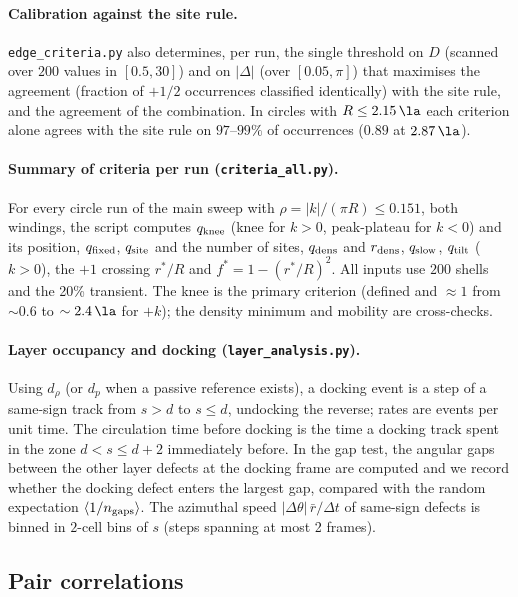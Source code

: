 \paragraph{Calibration against the site rule.}
\texttt{edge\_criteria.py} also determines, per run, the single threshold on $D$ (scanned over $200$ values
in $[0.5,30]$) and on $|\Delta|$ (over $[0.05,\pi]$) that maximises the agreement (fraction of $+1/2$
occurrences classified identically) with the site rule, and the agreement of the combination. In circles
with $R\le2.15\,\la$ each criterion alone agrees with the site rule on $97$--$99\%$ of occurrences
($0.89$ at $2.87\,\la$).

\paragraph{Summary of criteria per run (\texttt{criteria\_all.py}).}
For every circle run of the main sweep with $\rho=|k|/(\pi R)\le0.151$, both windings, the script computes
$q_{\rm knee}$ (knee for $k>0$, peak-plateau for $k<0$) and its position, $q_{\rm fixed}$, $q_{\rm site}$
and the number of sites, $q_{\rm dens}$ and $r_{\rm dens}$, $q_{\rm slow}$, $q_{\rm tilt}$ ($k>0$), the
$+1$ crossing $r^*/R$ and $f^*=1-(r^*/R)^2$. All inputs use $200$ shells and the 20\% transient.
The knee is the primary criterion (defined and $\approx1$ from $\sim0.6$ to $\sim2.4\,\la$ for $+k$); the
density minimum and mobility are cross-checks.

\paragraph{Layer occupancy and docking (\texttt{layer\_analysis.py}).}
Using $d_\rho$ (or $d_p$ when a passive reference exists), a docking event is a step of a same-sign track
from $s>d$ to $s\le d$, undocking the reverse; rates are events per unit time. The circulation time before
docking is the time a docking track spent in the zone $d<s\le d+2$ immediately before. In the gap test, the
angular gaps between the other layer defects at the docking frame are computed and we record whether the
docking defect enters the largest gap, compared with the random expectation $\langle 1/n_{\rm gaps}\rangle$.
The azimuthal speed $|\Delta\theta|\,\bar r/\Delta t$ of same-sign defects is binned in $2$-cell bins of $s$
(steps spanning at most 2 frames).

\subsection{Pair correlations}
\label{sec:methods-gr}

